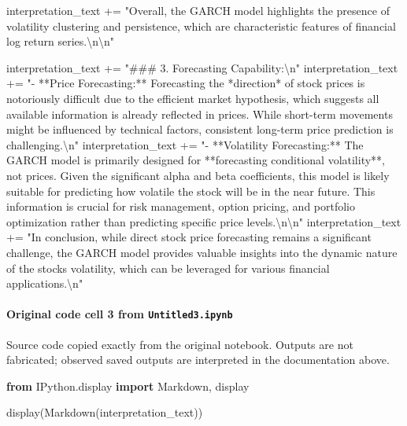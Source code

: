 \documentclass[
  11pt,
]{article}
\newenvironment{Shaded}{}{}
\newcommand{\CharTok}[1]{\textcolor[rgb]{0.25,0.44,0.63}{#1}}
\newcommand{\ImportTok}[1]{\textcolor[rgb]{0.00,0.50,0.00}{\textbf{#1}}}
\newcommand{\NormalTok}[1]{#1}
\newcommand{\OperatorTok}[1]{\textcolor[rgb]{0.40,0.40,0.40}{#1}}
\newcommand{\StringTok}[1]{\textcolor[rgb]{0.25,0.44,0.63}{#1}}
\begin{document}
\begin{Shaded}
\begin{Highlighting}[]
\NormalTok{interpretation\_text }\OperatorTok{+=} \StringTok{"Overall, the GARCH model highlights the presence of volatility clustering and persistence, which are characteristic features of financial log return series.}\CharTok{\textbackslash{}n\textbackslash{}n}\StringTok{"}

\NormalTok{interpretation\_text }\OperatorTok{+=} \StringTok{"\#\#\# 3. Forecasting Capability:}\CharTok{\textbackslash{}n}\StringTok{"}
\NormalTok{interpretation\_text }\OperatorTok{+=} \StringTok{"{-} **Price Forecasting:** Forecasting the *direction* of stock prices is notoriously difficult due to the efficient market hypothesis, which suggests all available information is already reflected in prices. While short{-}term movements might be influenced by technical factors, consistent long{-}term price prediction is challenging.}\CharTok{\textbackslash{}n}\StringTok{"}
\NormalTok{interpretation\_text }\OperatorTok{+=} \StringTok{"{-} **Volatility Forecasting:** The GARCH model is primarily designed for **forecasting conditional volatility**, not prices. Given the significant \textasciigrave{}alpha\textasciigrave{} and \textasciigrave{}beta\textasciigrave{} coefficients, this model is likely suitable for predicting how volatile the stock will be in the near future. This information is crucial for risk management, option pricing, and portfolio optimization rather than predicting specific price levels.}\CharTok{\textbackslash{}n\textbackslash{}n}\StringTok{"}
\NormalTok{interpretation\_text }\OperatorTok{+=} \StringTok{"In conclusion, while direct stock price forecasting remains a significant challenge, the GARCH model provides valuable insights into the dynamic nature of the stock\textquotesingle{}s volatility, which can be leveraged for various financial applications.}\CharTok{\textbackslash{}n}\StringTok{"}
\end{Highlighting}
\end{Shaded}

\paragraph{\texorpdfstring{Original code cell 3 from \texttt{Untitled3.ipynb}}{Original code cell 3 from Untitled3.ipynb}}\label{original-code-cell-3-from-untitled3ipynb}

Source code copied exactly from the original notebook. Outputs are not fabricated; observed saved outputs are interpreted in the documentation above.

\begin{Shaded}
\begin{Highlighting}[]

\ImportTok{from}\NormalTok{ IPython.display }\ImportTok{import}\NormalTok{ Markdown, display}

\NormalTok{display(Markdown(interpretation\_text))}
\end{Highlighting}
\end{Shaded}
\end{document}
